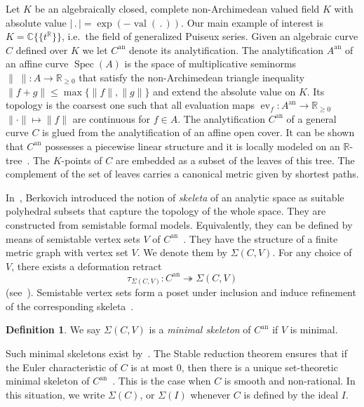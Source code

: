 \documentclass[11pt]{amsart}
\numberwithin{equation}{section}
\theoremstyle{plain}
\theoremstyle{definition}
\newtheorem{definition}[theorem]{Definition}
\theoremstyle{remark}
\begin{document}
Let $K$ be an algebraically closed, complete non-Archimedean valued
field $K$ with absolute value $|\,.\,| =\exp(-\operatorname{val}(\,.\,))$. Our main
example of interest is $K={\mathbb{C}}\{\!\{t^{\mathbb{R}}\}\!\}$, i.e.\ the field of
generalized Puiseux series. Given an algebraic curve $C$ defined over
$K$ we let $C^\operatorname{an}$ denote its analytification. The analytification
$A^\operatorname{an}$ of an affine curve $\operatorname{\operatorname{Spec}}(A)$ is the space of multiplicative
seminorms $\|\; \|\colon A\to {\mathbb{R}}_{\geq 0}$ that satisfy the
non-Archimedean triangle inequality $\|f+g\|\leq \max\{\|f\|, \|g\|\}$
and extend the absolute value on $K$. Its topology is the coarsest one
such that all evaluation maps $\operatorname{ev}_f\colon A^\operatorname{an}\to
{\mathbb{R}}_{\geq 0}$ $\|\cdot\| \mapsto \|f\|$ are continuous for $f\in A$.
The analytification $C^\operatorname{an}$ of a general curve $C$ is glued from the
analytification of an affine open cover.  It can be shown that
$C^\operatorname{an}$ possesses a piecewise linear structure and it is locally
modeled on an ${\mathbb{R}}$-tree~\cite[$\S 5.8$]{BPRContempMath}. The
$K$-points of $C$ are embedded as a subset of the leaves of this
tree. The complement of the set of leaves carries a canonical metric
given by shortest paths.

In~\cite{Berk1990}, Berkovich introduced the notion of \emph{skeleta}
of an analytic space as suitable polyhedral subsets that capture the
topology of the whole space.  They are constructed from semistable
formal models. Equivalently, they can be defined by means of
semistable vertex sets $V$ of $C^\operatorname{an}$~\cite[$\S 1.2$,
Theorem~1.3]{BPRContempMath}. They have the structure of a finite
metric graph with vertex set $V$. We denote them by $\Sigma(C,V)$. For
any choice of $V$, there exists a deformation retract
\begin{equation}
\tau_{\Sigma(C,V)}\colon C^\operatorname{an}\twoheadrightarrow \Sigma(C,V)\label{eq:retraction}
\end{equation}
(see~\cite{BPRContempMath,Berkovich_LocContractI}). Semistable vertex
sets form a poset under inclusion and induce refinement of the
corresponding
skeleta~\cite[Proposition~3.13(1)]{BPRContempMath}. 

\begin{definition}
  We say $\Sigma(C,V)$ is a \emph{minimal skeleton} of $C^\operatorname{an}$ if
  $V$ is minimal.
\end{definition}
Such minimal skeletons exist by~\cite[$\S 4.16$]{BPRContempMath}. The
Stable reduction theorem ensures that if the Euler characteristic of
$C$ is at most 0, then there is a unique set-theoretic minimal
skeleton of $C^\operatorname{an}$~\cite[Theorem 4.22]{BPRContempMath}. This is the
case when $C$ is smooth and non-rational. In this situation, we write
$\Sigma(C)$, or $\Sigma(I)$ whenever $C$ is defined by the ideal $I$.
\end{document}
